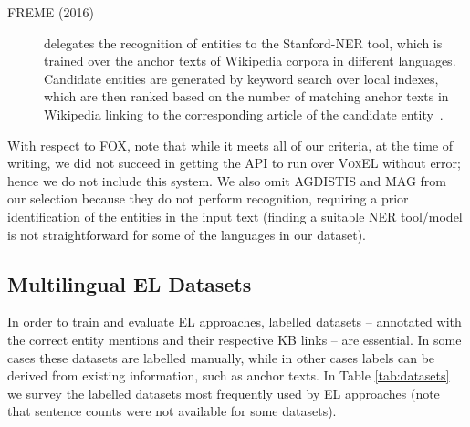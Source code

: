 \documentclass{llncs}
\begin{document}
\begin{description}
\item[FREME (2016)] delegates the recognition of entities to the Stanford-NER tool, which is trained over the anchor texts of Wikipedia corpora in different languages. Candidate entities are generated by keyword search over local indexes, which are then ranked based on the number of matching anchor texts in Wikipedia linking to the corresponding article of the candidate entity~\cite{freme-ner2016}.
\end{description}

With respect to FOX, note that while it meets all of our criteria, at the time of writing, we did not succeed in getting the API to run over \textsc{VoxEL} without error; hence we do not include this system. We also omit AGDISTIS and MAG from our selection because they do not perform recognition, requiring a prior identification of the entities in the input text (finding a suitable NER tool/model is not straightforward for some of the languages in our dataset).




\subsection{Multilingual EL Datasets}

In order to train and evaluate EL approaches, labelled datasets -- annotated with the correct entity mentions and their respective KB links -- are essential. In some cases these datasets are labelled manually, while in other cases labels can be derived from existing information, such as anchor texts. In Table \ref{tab:datasets} we survey the labelled datasets most frequently used by EL approaches (note that sentence counts were not available for some datasets).
\end{document}
